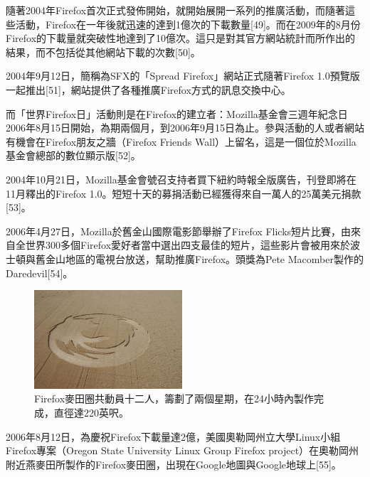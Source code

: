 \documentclass[12pt, a4paper, twoside]{article}
\begin{document}
隨著2004年Firefox首次正式發佈開始，就開始展開一系列的推廣活動，而隨著這些活動，Firefox在一年後就迅速的達到1億次的下載數量[49]。而在2009年的8月份Firefox的下載量就突破性地達到了10億次。這只是對其官方網站統計而所作出的結果，而不包括從其他網站下載的次數[50]。

2004年9月12日，簡稱為SFX的「Spread Firefox」網站正式隨著Firefox 1.0預覽版一起推出[51]，網站提供了各種推廣Firefox方式的訊息交換中心。

而「世界Firefox日」活動則是在Firefox的建立者：Mozilla基金會三週年紀念日2006年8月15日開始，為期兩個月，到2006年9月15日為止。參與活動的人或者網站有機會在Firefox朋友之牆（Firefox Friends Wall）上留名，這是一個位於Mozilla基金會總部的數位顯示版[52]。

2004年10月21日，Mozilla基金會號召支持者買下紐約時報全版廣告，刊登即將在11月釋出的Firefox 1.0。短短十天的募捐活動已經獲得來自一萬人的25萬美元捐款[53]。

2006年4月27日，Mozilla於舊金山國際電影節舉辦了Firefox Flicks短片比賽，由來自全世界300多個Firefox愛好者當中選出四支最佳的短片，這些影片會被用來於波士頓與舊金山地區的電視台放送，幫助推廣Firefox。頭獎為Pete Macomber製作的Daredevil[54]。

\addtocounter{footnote}{-3}
\begin{figure}
  \begin{center}
    \includegraphics[width=55mm]{Firefox_Crop_Circle}
  \end{center}
  \caption{Firefox麥田圈共動員十二人\protect\footnotemark，籌劃了兩個星期，在24小時內製作完成\protect\footnotemark，直徑達220英呎。\protect\footnotemark}
\end{figure}

\addtocounter{footnote}{-3}

2006年8月12日，為慶祝Firefox下載量達2億，美國奧勒岡州立大學Linux小組Firefox專案（Oregon State University Linux Group Firefox project）在奧勒岡州附近燕麥田所製作的Firefox麥田圈，出現在Google地圖與Google地球上[55]。
\end{document}
